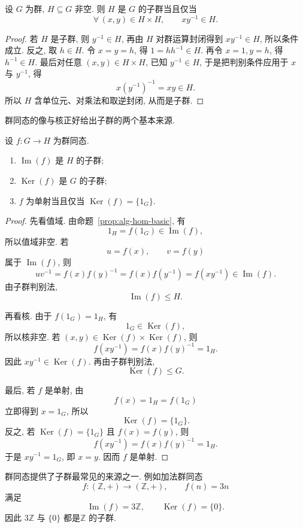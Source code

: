 \documentclass[usesamecnt, thmcnt=section, lang=cn, newtx, 10pt, scheme=chinese]{elegantbook}
\begin{document}
\begin{proposition}\label{prop:alg-subgroup-criterion}
设 $G$ 为群, $H\subseteq G$ 非空. 则 $H$ 是 $G$ 的子群当且仅当
\[
 \forall\,(x,y)\in H\times H,\qquad xy^{-1}\in H.
\]
\end{proposition}

\begin{proof}
若 $H$ 是子群, 则 $y^{-1}\in H$, 再由 $H$ 对群运算封闭得到 $xy^{-1}\in H$, 所以条件成立. 反之, 取 $h\in H$. 令 $x=y=h$, 得 $1=hh^{-1}\in H$. 再令 $x=1,y=h$, 得 $h^{-1}\in H$. 最后对任意 $(x,y)\in H\times H$, 已知 $y^{-1}\in H$, 于是把判别条件应用于 $x$ 与 $y^{-1}$, 得
\[
 x(y^{-1})^{-1}=xy\in H.
\]
所以 $H$ 含单位元、对乘法和取逆封闭, 从而是子群.
\end{proof}

群同态的像与核正好给出子群的两个基本来源.

\begin{proposition}\label{prop:alg-image-kernel}
设 $f:G\to H$ 为群同态.
\begin{enumerate}[label=\rm(\arabic*)]
  \item $\operatorname{Im}(f)$ 是 $H$ 的子群;
  \item $\operatorname{Ker}(f)$ 是 $G$ 的子群;
  \item $f$ 为单射当且仅当 $\operatorname{Ker}(f)=\{1_G\}$.
\end{enumerate}
\end{proposition}

\begin{proof}
先看值域. 由命题~\ref{prop:alg-hom-basic}, 有
\[
 1_H=f(1_G)\in\operatorname{Im}(f),
\]
所以值域非空. 若
\[
 u=f(x),\qquad v=f(y)
\]
属于 $\operatorname{Im}(f)$, 则
\[
 uv^{-1}
 =f(x)f(y)^{-1}
 =f(x)f(y^{-1})
 =f(xy^{-1})
 \in\operatorname{Im}(f).
\]
由子群判别法,
\[
 \operatorname{Im}(f)\leq H.
\]

再看核. 由于 $f(1_G)=1_H$, 有
\[
 1_G\in\operatorname{Ker}(f),
\]
所以核非空. 若 $(x,y)\in\operatorname{Ker}(f)\times\operatorname{Ker}(f)$, 则
\[
 f(xy^{-1})
 =f(x)f(y)^{-1}
 =1_H.
\]
因此 $xy^{-1}\in\operatorname{Ker}(f)$. 再由子群判别法,
\[
 \operatorname{Ker}(f)\leq G.
\]

最后, 若 $f$ 是单射, 由
\[
 f(x)=1_H=f(1_G)
\]
立即得到 $x=1_G$, 所以
\[
 \operatorname{Ker}(f)=\{1_G\}.
\]
反之, 若 $\operatorname{Ker}(f)=\{1_G\}$ 且 $f(x)=f(y)$, 则
\[
 f(xy^{-1})
 =f(x)f(y)^{-1}
 =1_H.
\]
于是 $xy^{-1}=1_G$, 即 $x=y$. 因而 $f$ 是单射.
\end{proof}

\begin{instance}
群同态提供了子群最常见的来源之一. 例如加法群同态
\[
 f:(\mathbb Z,+)\longrightarrow(\mathbb Z,+),
 \qquad f(n)=3n
\]
满足
\[
 \operatorname{Im}(f)=3\mathbb Z,
 \qquad
 \operatorname{Ker}(f)=\{0\}.
\]
因此 $3\mathbb Z$ 与 $\{0\}$ 都是$\mathbb Z$ 的子群.
\end{instance}
\end{document}
